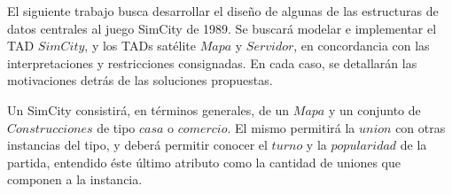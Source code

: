 \vspace{6ex}
\vspace{2ex}

El siguiente trabajo busca desarrollar el diseño de algunas de las estructuras de datos centrales al juego SimCity de 1989. Se buscará modelar e implementar el TAD $SimCity$, y los TADs satélite $Mapa$ y $Servidor$, en concordancia con las interpretaciones y restricciones consignadas. En cada caso, se detallarán las motivaciones detrás de las soluciones propuestas. 

Un SimCity consistirá, en términos generales, de un $Mapa$ y un conjunto de $Construcciones$ de tipo $casa$ o $comercio$. El mismo permitirá la $union$ con otras instancias del tipo, y deberá permitir conocer el $turno$ y la $popularidad$ de la partida, entendido éste último atributo como la cantidad de uniones que componen a la instancia. 
